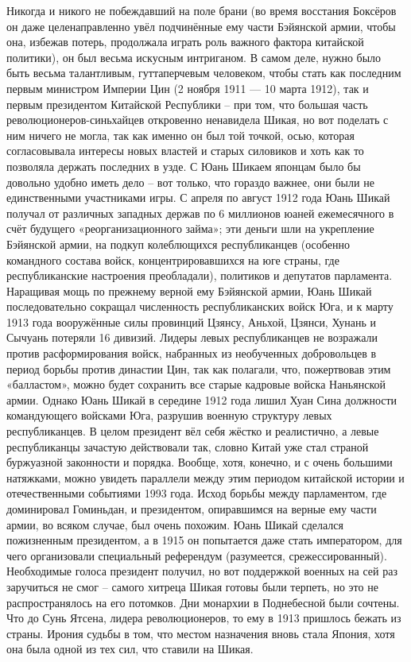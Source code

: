 Никогда и никого не побеждавший на поле брани (во время восстания Боксёров он даже целенаправленно увёл подчинённые ему части Бэйянской армии, чтобы она, избежав потерь, продолжала играть роль важного фактора китайской политики), он был весьма искусным интриганом. В самом деле, нужно было быть весьма талантливым, гуттаперчевым человеком, чтобы стать как последним первым министром Империи Цин (2 ноября 1911 — 10 марта 1912), так и первым президентом Китайской Республики – при том, что большая часть революционеров-синьхайцев откровенно ненавидела Шикая, но вот поделать с ним ничего не могла, так как именно он был той точкой, осью, которая согласовывала интересы новых властей и старых силовиков и хоть как то позволяла держать последних в узде. С Юань Шикаем японцам было бы довольно удобно иметь дело – вот только, что гораздо важнее, они были не единственными участниками игры. С апреля по август 1912 года Юань Шикай получал от различных западных держав по 6 миллионов юаней ежемесячного в счёт будущего «реорганизационного займа»; эти деньги шли на укрепление Бэйянской армии, на подкуп колеблющихся республиканцев (особенно командного состава войск, концентрировавшихся на юге страны, где республиканские настроения преобладали), политиков и депутатов парламента. Наращивая мощь по прежнему верной ему Бэйянской армии, Юань Шикай последовательно сокращал численность республиканских войск Юга, и к марту 1913 года вооружённые силы провинций Цзянсу, Аньхой, Цзянси, Хунань и Сычуань потеряли 16 дивизий. Лидеры левых республиканцев не возражали против расформирования войск, набранных из необученных добровольцев в период борьбы против династии Цин, так как полагали, что, пожертвовав этим «балластом», можно будет сохранить все старые кадровые войска Наньянской армии. Однако Юань Шикай в середине 1912 года лишил Хуан Сина должности командующего войсками Юга, разрушив военную структуру левых республиканцев. В целом президент вёл себя жёстко и реалистично, а левые республиканцы зачастую действовали так, словно Китай уже стал страной буржуазной законности и порядка. Вообще, хотя, конечно, и с очень большими натяжками, можно увидеть параллели между этим периодом китайской истории и отечественными событиями 1993 года. Исход борьбы между парламентом, где доминировал Гоминьдан, и президентом, опиравшимся на верные ему части армии, во всяком случае, был очень похожим. Юань Шикай сделался пожизненным президентом, а в 1915 он попытается даже стать императором, для чего организовали специальный референдум (разумеется, срежессированный). Необходимые голоса президент получил, но вот поддержкой военных на сей раз заручиться не смог – самого хитреца Шикая готовы были терпеть, но это не распространялось на его потомков. Дни монархии в Поднебесной были сочтены. Что до Сунь Ятсена, лидера революционеров, то ему в 1913 пришлось бежать из страны. Ирония судьбы в том, что местом назначения вновь стала Япония, хотя она была одной из тех сил, что ставили на Шикая.

